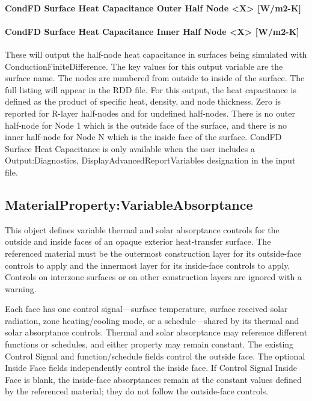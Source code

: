 \paragraph{CondFD Surface Heat Capacitance Outer Half Node \textless{}X\textgreater{} {[}W/m2-K{]}}\label{condfd-surface-heat-capacitance-outer-half-node-x-wm2-k}

\paragraph{CondFD Surface Heat Capacitance Inner Half Node \textless{}X\textgreater{} {[}W/m2-K{]}}\label{condfd-surface-heat-capacitance-inner-half-node-x-wm2-k}

These will output the half-node heat capacitance in surfaces being simulated with ConductionFiniteDifference. The key values for this output variable are the surface name. The nodes are numbered from outside to inside of the surface. The full listing will appear in the RDD file. For this output, the heat capacitance is defined as the product of specific heat, density, and node thickness. Zero is reported for R-layer half-nodes and for undefined half-nodes. There is no outer half-node for Node 1 which is the outside face of the surface, and there is no inner half-node for Node N which is the inside face of the surface. CondFD Surface Heat Capacitance is only available when the user includes a Output:Diagnostics, DisplayAdvancedReportVariables designation in the input file.

\subsection{MaterialProperty:VariableAbsorptance}\label{materialpropertyvariableabsorptance}

This object defines variable thermal and solar absorptance controls for the outside and inside faces of an opaque exterior heat-transfer surface. The referenced material must be the outermost construction layer for its outside-face controls to apply and the innermost layer for its inside-face controls to apply. Controls on interzone surfaces or on other construction layers are ignored with a warning.

Each face has one control signal---surface temperature, surface received solar radiation, zone heating/cooling mode, or a schedule---shared by its thermal and solar absorptance controls. Thermal and solar absorptance may reference different functions or schedules, and either property may remain constant. The existing Control Signal and function/schedule fields control the outside face. The optional Inside Face fields independently control the inside face. If Control Signal Inside Face is blank, the inside-face absorptances remain at the constant values defined by the referenced material; they do not follow the outside-face controls.

